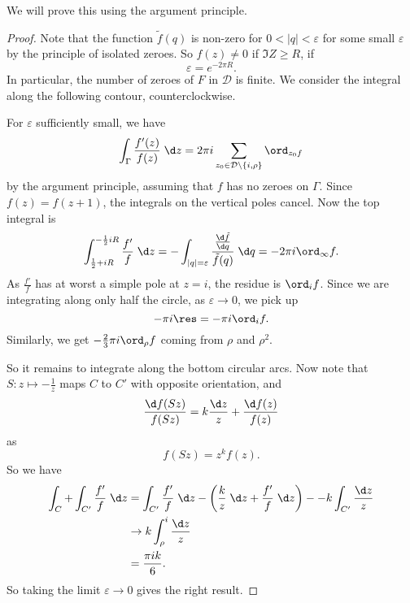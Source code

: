 \documentclass[a4paper]{article}
\begin{document}
We will prove this using the argument principle.
\begin{proof}
  Note that the function $\tilde{f}(q)$ is non-zero for $0 < |q| < \varepsilon$ for some small $\varepsilon$ by the principle of isolated zeroes. So $f(z) \not= 0$ if $\Im Z \geq R$, if
  \[
    \varepsilon = e^{-2\pi R}.
  \]
  In particular, the number of zeroes of $F$ in $\mathcal{D}$ is finite. We consider the integral along the following contour, counterclockwise.
  \begin{center}
  \end{center}
  For $\varepsilon$ sufficiently small, we have
  \[
    \int_\Gamma \frac{f'(z)}{f(z)}\;\d z = 2\pi i \sum_{z_0 \in \mathcal{D} \setminus \{i, \rho\}} \ord_{z_0 f}
  \]
  by the argument principle, assuming that $f$ has no zeroes on $\Gamma$. Since $f(z) = f(z + 1)$, the integrals on the vertical poles cancel. Now the top integral is
  \[
    \int_{\frac{1}{2} + iR}^{-\frac{1}{2} iR} \frac{f'}{f}\;\d z = -\int_{|q| = \varepsilon} \frac{\frac{\d \tilde{f}}{\d q}}{\tilde{f}(q)} \;\d q = -2\pi i \ord_{\infty} f.
  \]
  As $\frac{f'}{f}$ has at worst a simple pole at $z = i$, the residue is $\ord_i f$. Since we are integrating along only half the circle, as $\varepsilon \to 0$, we pick up
  \[
    - \pi i \res = - \pi i \ord_i f.
  \]
  Similarly, we get $-\frac{2}{3} \pi i \ord_\rho f$ coming from $\rho$ and $\rho^2$.

  So it remains to integrate along the bottom circular arcs. Now note that $S: z \mapsto -\frac{1}{z}$ maps $C$ to $C'$ with opposite orientation, and
  \[
    \frac{\d f(Sz)}{f(Sz)} = k \frac{\d z}{z} + \frac{\d f(z)}{f(z)}
  \]
  as
  \[
    f(Sz) = z^k f(z).
  \]
  So we have
  \begin{align*}
    \int_C + \int_{C'} \frac{f'}{f}\;\d z &= \int_{C'} \frac{f'}{f}\;\d z - \left(\frac{k}{z} \;\d z + \frac{f'}{f}\;\d z\right) - -k \int_{C'} \frac{\d z}{z}\\
    &\to k \int_\rho^i \frac{\d z}{z} \\
    &= \frac{\pi i k}{6}.
  \end{align*}
  So taking the limit $\varepsilon \to 0$ gives the right result.


\end{proof}
\end{document}
